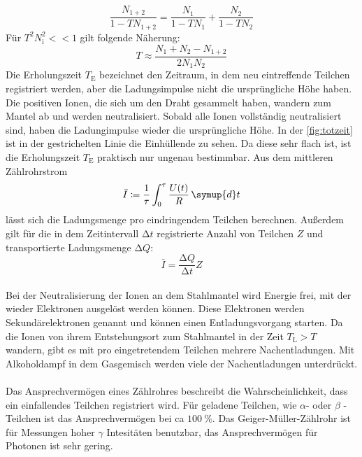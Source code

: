 \begin{equation*}
    \frac{N_{1+2}}{1-TN_{1+2}} = \frac{N_1}{1-TN_1}+\frac{N_2}{1-TN_2}
\end{equation*}
Für $T^2N_{\text{i}}^2 <<1$ gilt folgende Näherung:
\begin{equation}\label{eqn:totzeit}
    T \approx \frac{N_1 + N_2 - N_{1+2}}{2N_1N_2}
\end{equation}
Die Erholungszeit $T_{\text{E}}$ bezeichnet den Zeitraum, in dem neu eintreffende Teilchen registriert werden, aber die Ladungsimpulse nicht die ursprüngliche Höhe haben.
Die positiven Ionen, die sich um den Draht gesammelt haben, wandern zum Mantel ab und werden neutralisiert.
Sobald alle Ionen vollständig neutralisiert sind, haben die Ladungimpulse wieder die ursprüngliche Höhe.
In der \autoref{fig:totzeit} ist in der gestrichelten Linie die Einhüllende zu sehen.
Da diese sehr flach ist, ist die Erholungszeit $T_{\text{E}}$ praktisch nur ungenau bestimmbar.
Aus dem mittleren Zählrohrstrom 
 \begin{equation*}
     \bar{I} \coloneq \frac{1}{\tau} \int_0^{\tau} \frac{U(t)}{R}\,\symup{d}t
 \end{equation*} 
 lässt sich die Ladungsmenge pro eindringendem Teilchen berechnen.
 Außerdem gilt für die in dem Zeitintervall $\increment t$ registrierte Anzahl von Teilchen $Z$ und transportierte Ladungsmenge $\increment Q$:
 \begin{equation}\label{eqn:Ladung}
     \bar{I} = \frac{\increment Q}{\increment t} Z
 \end{equation}\\
Bei der Neutralisierung der Ionen an dem Stahlmantel wird Energie frei, mit der wieder Elektronen ausgelöst werden können.
Diese Elektronen werden Sekundärelektronen genannt und können einen Entladungsvorgang starten.
Da die Ionen von ihrem Entstehungsort zum Stahlmantel in der Zeit $T_{\text{L}}>T$ wandern, gibt es mit pro eingetretendem Teilchen mehrere Nachentladungen.
Mit Alkoholdampf in dem Gasgemisch werden viele der Nachentladungen unterdrückt.\\
\\
Das Ansprechvermögen eines Zählrohres beschreibt die Wahrscheinlichkeit, dass ein einfallendes Teilchen registriert wird.
Für geladene Teilchen, wie $\alpha$- oder $\beta $ -Teilchen ist das Ansprechvermögen bei ca $\SI{100}{\percent}$.
Das Geiger-Müller-Zählrohr ist für Messungen hoher $\gamma$ Intesitäten benutzbar, das Ansprechvermögen für Photonen ist sehr gering.\\
